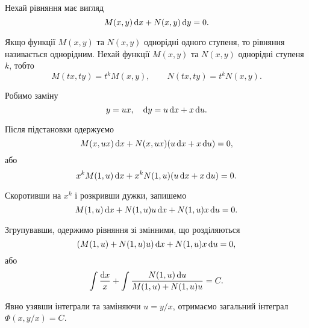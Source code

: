Нехай рівняння має вигляд
\begin{equation*}
	M(x, y) \mathop{}\!\mathrm{d}	x + N(x, y) \mathop{}\!\mathrm{d} y = 0.
\end{equation*}

Якщо функції $M(x, y)$ та $N(x, y)$ однорідні одного ступеня, то рівняння називається однорідним. Нехай функції $M(x, y)$ та $N(x, y)$ однорідні ступеня $k$, тобто
\begin{equation*}
	M(t x, t y) = t^k M(x, y), \qquad N(t x, t y) = t^k N(x, y).
\end{equation*}

Робимо заміну 
\begin{equation*}
	y = u x, \quad \mathop{}\!\mathrm{d} y = u \mathop{}\!\mathrm{d} x + x \mathop{}\!\mathrm{d} u.
\end{equation*}

Після підстановки одержуємо
\begin{equation*}
	M(x, u x) \mathop{}\!\mathrm{d} x + N(x, u x) (u \mathop{}\!\mathrm{d} x + x \mathop{}\!\mathrm{d} u) = 0,
\end{equation*}
або 
\begin{equation*}
	x^k M(1, u) \mathop{}\!\mathrm{d} x + x^k N(1, u) (u \mathop{}\!\mathrm{d} x + x \mathop{}\!\mathrm{d} u) = 0.
\end{equation*}

Скоротивши на $x^k$ і розкривши дужки, запишемо 
\begin{equation*}
	M(1, u) \mathop{}\!\mathrm{d} x + N(1, u) u \mathop{}\!\mathrm{d} x + N(1, u) x \mathop{}\!\mathrm{d} u = 0.
\end{equation*}

Згрупувавши, одержимо рівняння зі змінними, що розділяються
\begin{equation*}
	(M(1, u) + N(1, u) u) \mathop{}\!\mathrm{d} x + N(1, u) x \mathop{}\!\mathrm{d} u = 0,
\end{equation*}
або 
\begin{equation*}
	\int \frac{\mathop{}\!\mathrm{d} x}{x} + \int \frac{N(1, u) \mathop{}\!\mathrm{d} u}{M(1, u) + N(1, u) u} = C.
\end{equation*}

Явно узявши інтеграли та заміняючи $u = y / x$, отримаємо загальний інтеграл $\Phi \left( x, y / x \right) = C$.